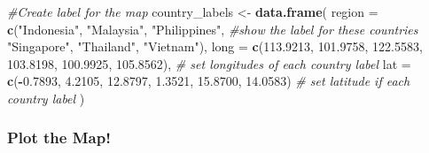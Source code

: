 \documentclass[
]{article}
\newenvironment{Shaded}{\begin{snugshade}}{\end{snugshade}}
\newcommand{\AttributeTok}[1]{\textcolor[rgb]{0.13,0.29,0.53}{#1}}
\newcommand{\CommentTok}[1]{\textcolor[rgb]{0.56,0.35,0.01}{\textit{#1}}}
\newcommand{\FloatTok}[1]{\textcolor[rgb]{0.00,0.00,0.81}{#1}}
\newcommand{\FunctionTok}[1]{\textcolor[rgb]{0.13,0.29,0.53}{\textbf{#1}}}
\newcommand{\NormalTok}[1]{#1}
\newcommand{\OtherTok}[1]{\textcolor[rgb]{0.56,0.35,0.01}{#1}}
\newcommand{\SpecialCharTok}[1]{\textcolor[rgb]{0.81,0.36,0.00}{\textbf{#1}}}
\newcommand{\StringTok}[1]{\textcolor[rgb]{0.31,0.60,0.02}{#1}}
\begin{document}
\begin{Shaded}
\begin{Highlighting}[]
\CommentTok{\#Create label for the map}
\NormalTok{country\_labels }\OtherTok{\textless{}{-}} \FunctionTok{data.frame}\NormalTok{(}
  \AttributeTok{region =} \FunctionTok{c}\NormalTok{(}\StringTok{"Indonesia"}\NormalTok{, }\StringTok{"Malaysia"}\NormalTok{, }\StringTok{"Philippines"}\NormalTok{,  }\CommentTok{\#show the label for these countries}
             \StringTok{"Singapore"}\NormalTok{, }\StringTok{"Thailand"}\NormalTok{, }\StringTok{"Vietnam"}\NormalTok{),}
  \AttributeTok{long =} \FunctionTok{c}\NormalTok{(}\FloatTok{113.9213}\NormalTok{, }\FloatTok{101.9758}\NormalTok{, }\FloatTok{122.5583}\NormalTok{, }\FloatTok{103.8198}\NormalTok{, }\FloatTok{100.9925}\NormalTok{, }\FloatTok{105.8562}\NormalTok{), }\CommentTok{\# set longitudes of each country label}
  \AttributeTok{lat =} \FunctionTok{c}\NormalTok{(}\SpecialCharTok{{-}}\FloatTok{0.7893}\NormalTok{, }\FloatTok{4.2105}\NormalTok{, }\FloatTok{12.8797}\NormalTok{, }\FloatTok{1.3521}\NormalTok{, }\FloatTok{15.8700}\NormalTok{, }\FloatTok{14.0583}\NormalTok{)        }\CommentTok{\# set latitude if each country label}
\NormalTok{)}
\end{Highlighting}
\end{Shaded}

\hypertarget{plot-the-map}{%
\subsubsection{Plot the Map!}\label{plot-the-map}}
\end{document}
